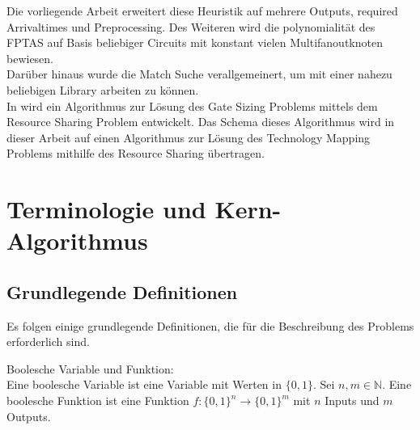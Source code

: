 \documentclass[11pt, a4paper, german]{article}
\newcommand{\TM}{Technology  Mapping }
\begin{document}
Die vorliegende Arbeit erweitert diese Heuristik auf mehrere Outputs, required Arrivaltimes und Preprocessing. Des Weiteren wird die polynomialit\"at des FPTAS auf Basis beliebiger Circuits mit konstant vielen Multifanoutknoten bewiesen.\\ Darüber hinaus wurde die Match Suche verallgemeinert, um mit einer nahezu beliebigen Library arbeiten zu k\"onnen.\\

In \cite{Daboul2018} wird ein Algorithmus zur L\"osung des Gate Sizing Problems mittels dem Resource Sharing Problem entwickelt. Das Schema dieses Algorithmus wird in dieser Arbeit auf einen Algorithmus zur L\"osung des \TM Problems mithilfe des Resource Sharing \"ubertragen.

\section{Terminologie und Kern-Algorithmus}
\label{sec:terminologie&grundl}
\subsection{Grundlegende Definitionen}
\label{subsec:grundlegende_definitionen}
Es folgen einige grundlegende Definitionen, die für die Beschreibung des Problems erforderlich sind.

\begin{definition}{Boolesche Variable und Funktion: } \\
Eine boolesche Variable ist eine Variable mit Werten in $ \{ 0 , 1 \} $.
Sei $ n, m \in \mathbb{N}$. Eine boolesche Funktion ist eine Funktion $ f : \{ 0 , 1 \}^n \rightarrow \{ 0 , 1 \}^m $ mit $n$ Inputs und $m$ Outputs. 
\end{definition}
\end{document}
